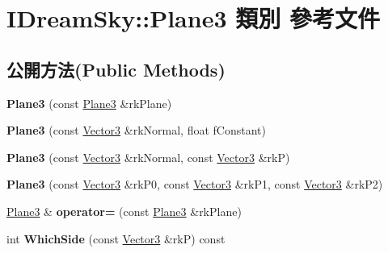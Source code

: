 \hypertarget{class_i_dream_sky_1_1_plane3}{}\section{I\+Dream\+Sky\+:\+:Plane3 類別 參考文件}
\label{class_i_dream_sky_1_1_plane3}
\subsection*{公開方法(Public Methods)}
\begin{DoxyCompactItemize}
\item 
{\bfseries Plane3} (const \hyperlink{class_i_dream_sky_1_1_plane3}{Plane3} \&rk\+Plane)\hypertarget{class_i_dream_sky_1_1_plane3_a03918286c6d307ff88c9518ee43b542f}{}\label{class_i_dream_sky_1_1_plane3_a03918286c6d307ff88c9518ee43b542f}

\item 
{\bfseries Plane3} (const \hyperlink{class_i_dream_sky_1_1_vector3}{Vector3} \&rk\+Normal, float f\+Constant)\hypertarget{class_i_dream_sky_1_1_plane3_a1b63df0fe10e6056ddf9c8ecfed36c13}{}\label{class_i_dream_sky_1_1_plane3_a1b63df0fe10e6056ddf9c8ecfed36c13}

\item 
{\bfseries Plane3} (const \hyperlink{class_i_dream_sky_1_1_vector3}{Vector3} \&rk\+Normal, const \hyperlink{class_i_dream_sky_1_1_vector3}{Vector3} \&rkP)\hypertarget{class_i_dream_sky_1_1_plane3_a98abcfc1a8c8128b6ad6b9dfa88b5372}{}\label{class_i_dream_sky_1_1_plane3_a98abcfc1a8c8128b6ad6b9dfa88b5372}

\item 
{\bfseries Plane3} (const \hyperlink{class_i_dream_sky_1_1_vector3}{Vector3} \&rk\+P0, const \hyperlink{class_i_dream_sky_1_1_vector3}{Vector3} \&rk\+P1, const \hyperlink{class_i_dream_sky_1_1_vector3}{Vector3} \&rk\+P2)\hypertarget{class_i_dream_sky_1_1_plane3_a3145e4d209de591eb45a3885b2cd7d28}{}\label{class_i_dream_sky_1_1_plane3_a3145e4d209de591eb45a3885b2cd7d28}

\item 
\hyperlink{class_i_dream_sky_1_1_plane3}{Plane3} \& {\bfseries operator=} (const \hyperlink{class_i_dream_sky_1_1_plane3}{Plane3} \&rk\+Plane)\hypertarget{class_i_dream_sky_1_1_plane3_a760f4e92768fc61864b373260d37a3fb}{}\label{class_i_dream_sky_1_1_plane3_a760f4e92768fc61864b373260d37a3fb}

\item 
int {\bfseries Which\+Side} (const \hyperlink{class_i_dream_sky_1_1_vector3}{Vector3} \&rkP) const \hypertarget{class_i_dream_sky_1_1_plane3_a0f54a143f4ecc727ed8ff6b78bcc9465}{}\label{class_i_dream_sky_1_1_plane3_a0f54a143f4ecc727ed8ff6b78bcc9465}


\end{DoxyCompactItemize}

